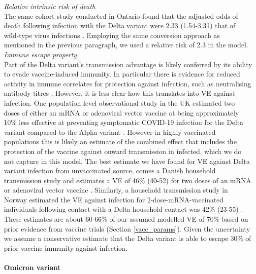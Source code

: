 \textit{Relative intrinsic risk of death}\\
The same cohort study conducted in Ontario found that the adjusted odds of death following infection with the Delta variant were 2.33 (1.54-3.31) that of wild-type virus infections \cite{fisman2021}. 
Employing the same conversion approach as mentioned in the previous paragraph, we used a relative risk of 2.3 in the model.\\

\textit{Immune escape property}\\
Part of the Delta variant's transmission advantage is likely conferred by its ability to evade vaccine-induced immunity. 
In particular there is evidence for reduced activity in immune correlates for protection against infection, such as neutralising 
antibody titres \cite{perezthen2022}. However, it is less clear how this translates into VE against infection. One population level 
observational study in the UK estimated two doses of either an mRNA or adenoviral vector vaccine at being approximately 10\% less effective 
at preventing symptomatic COVID-19 infection for the Delta variant compared to the Alpha variant \cite{lopezbernal2021}. 
However in highly-vaccinated populations this is likely an estimate of the combined effect that includes the protection of the vaccine 
against onward transmission in infected, which we do not capture in this model. 
The best estimate we have found for VE against Delta variant infection from unvaccinated source, comes a Danish household transmission study and estimates a VE of 46\% (40-52) for two doses of an 
mRNA or adenoviral vector vaccine \cite{lyngse2022c}. 
Similarly, a household transmission study in Norway estimated the VE against infection for 
2-dose-mRNA-vaccinated individuals following contact with a Delta household contact was 42\% (23-55) \cite{jalili2022}. 
These estimates are about 60-66\% of our assumed modelled VE of 70\% based on prior evidence from vaccine trials (Section \ref{vacc_params}). 
Given the uncertainty we assume a conservative estimate that the Delta variant is able to escape 30\% of prior vaccine immunity against infection.

\paragraph{Omicron variant}


